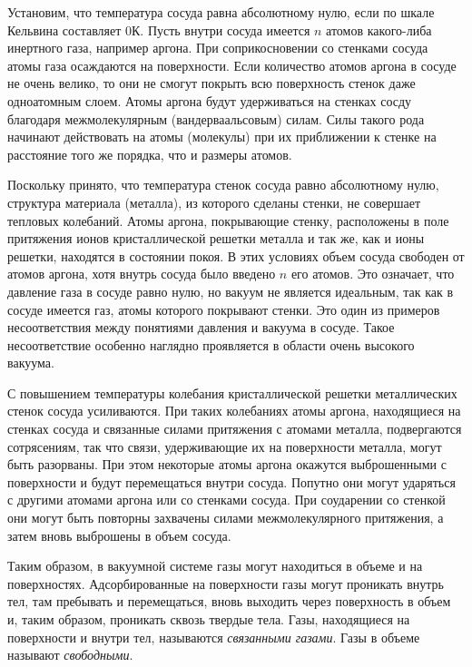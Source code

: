 \documentclass[12pt]{article}
\begin{document}
Установим, что температура сосуда равна абсолютному нулю, если по шкале Кельвина составляет 0К. Пусть внутри сосуда имеется $n$ атомов какого-либа инертного газа, например аргона. При соприкосновении со стенками сосуда атомы газа осаждаются на поверхности. Если количество атомов аргона в сосуде не очень велико, то они не смогут покрыть всю поверхность стенок даже одноатомным слоем. Атомы аргона будут удерживаться на стенках сосду благодаря межмолекулярным (вандерваальсовым) силам. Силы такого рода начинают действовать на атомы (молекулы) при их приближении к стенке на расстояние того же порядка, что и размеры атомов. \par
Поскольку принято, что температура стенок сосуда равно абсолютному нулю, структура материала (металла), из которого сделаны стенки, не совершает тепловых колебаний. Атомы аргона, покрывающие стенку, расположены в поле притяжения ионов кристаллической решетки металла и так же, как и ионы решетки, находятся в состоянии покоя. В этих условиях объем сосуда свободен от атомов аргона, хотя внутрь сосуда было введено $n$ его атомов. Это означает, что давление газа в сосуде равно нулю, но вакуум не является идеальным, так как в сосуде имеется газ, атомы которого покрывают стенки. Это один из примеров несоответствия между понятиями давления и вакуума в сосуде. Такое несоответствие особенно наглядно проявляется в области очень высокого вакуума. \par
С повышением температуры колебания кристаллической решетки металлических стенок сосуда усиливаются. При таких колебаниях атомы аргона, находящиеся на стенках сосуда и связанные силами притяжения с атомами металла, подвергаются сотрясениям, так что связи, удерживающие их на поверхности металла, могут быть разорваны. При этом некоторые атомы аргона окажутся выброшенными с поверхности и будут перемещаться внутри сосуда. Попутно они могут ударяться с другими атомами аргона или со стенками сосуда. При соударении со стенкой они могут быть повторны захвачены силами межмолекулярного притяжения, а затем вновь выброшены в объем сосуда. \par
Таким образом, в вакуумной системе газы могут находиться в объеме и на поверхностях. Адсорбированные на поверхности газы могут проникать внутрь тел, там пребывать и перемещаться, вновь выходить через поверхность в объем и, таким образом, проникать сквозь твердые тела. Газы, находящиеся на поверхности и внутри тел, называются \textit{связанными газами}. Газы в объеме называют \textit{свободными}.
\end{document}
